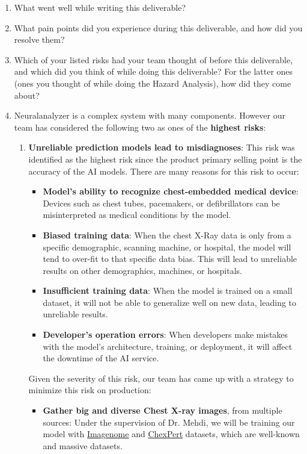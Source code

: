 \documentclass{article}
\begin{document}
\begin{enumerate}
    \item What went well while writing this deliverable? 
    \item What pain points did you experience during this deliverable, and how
    did you resolve them?
    \item Which of your listed risks had your team thought of before this
    deliverable, and which did you think of while doing this deliverable? For
    the latter ones (ones you thought of while doing the Hazard Analysis), how
    did they come about?
    \item Neuralanalyzer is a complex system with many components. However our team has considered the following two as ones of the \textbf{highest risks}:
    \begin{enumerate}
        \item \textbf{Unreliable prediction models lead to misdiagnoses}: This risk was identified as the highest risk since the product primary selling point is the accuracy of the AI models. There are many reasons for this risk to occur:
        \begin{itemize}
            \item \textbf{Model's ability to recognize chest-embedded medical device}: Devices such as chest tubes, pacemakers, or defibrillators can be misinterpreted as medical conditions by the model.
            \item \textbf{Biased training data}: When the chest X-Ray data is only from a specific demographic, scanning machine, or hospital, the model will tend to over-fit to that specific data bias. This will lead to unreliable results on other demographics, machines, or hospitals.
            \item \textbf{Insufficient training data}: When the model is trained on a small dataset, it will not be able to generalize well on new data, leading to unreliable results.
            \item \textbf{Developer's operation errors}: When developers make mistakes with the model's architecture, training, or deployment, it will affect the downtime of the AI service.
        \end{itemize}
        Given the severity of this risk, our team has came up with a strategy to minimize this risk on production:
        \begin{itemize}
            \item \textbf{Gather big and diverse Chest X-ray images}, from multiple sources: Under the supervision of Dr. Mehdi, we will be training our model with \href{https://physionet.org/content/chest-imagenome/1.0.0/}{Imagenome} and \href{https://stanfordmlgroup.github.io/competitions/chexpert/}{ChexPert} datasets, which are well-known and massive datasets.

\end{itemize}
\end{enumerate}
\end{enumerate}
\end{document}
